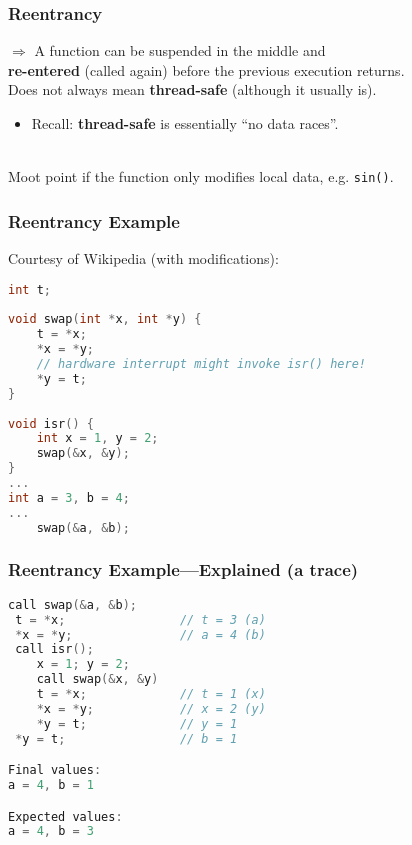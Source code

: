 \begin{frame}
  \frametitle{Reentrancy}

  
    $\Rightarrow$ A function can be suspended in the middle and \\ {\bf re-entered}
      (called again) before the previous execution returns.\\[1em]
    
     Does not always mean {\bf thread-safe} (although it usually is).
      \begin{itemize}
        \item Recall: {\bf thread-safe} is essentially ``no data races''.
      \end{itemize}
 ~\\[1em]
  Moot point if the function only modifies local data, e.g. {\tt sin()}.
  
\end{frame}

\begin{frame}[fragile]
  \frametitle{Reentrancy Example}

  

  Courtesy of Wikipedia (with modifications):
  \begin{lstlisting}[language=C]
int t;
 
void swap(int *x, int *y) {
    t = *x;
    *x = *y;
    // hardware interrupt might invoke isr() here!
    *y = t;
}
 
void isr() {
    int x = 1, y = 2;
    swap(&x, &y);
}
...
int a = 3, b = 4;
...
    swap(&a, &b);
  \end{lstlisting}
  
\end{frame}

\begin{frame}[fragile]
  \frametitle{Reentrancy Example---Explained (a trace)}

  
  \begin{lstlisting}[language=C]
call swap(&a, &b);
 t = *x;                // t = 3 (a)
 *x = *y;               // a = 4 (b)
 call isr();
    x = 1; y = 2;
    call swap(&x, &y)
    t = *x;             // t = 1 (x)
    *x = *y;            // x = 2 (y)
    *y = t;             // y = 1
 *y = t;                // b = 1

Final values:
a = 4, b = 1

Expected values:
a = 4, b = 3
  \end{lstlisting}
  
\end{frame}

